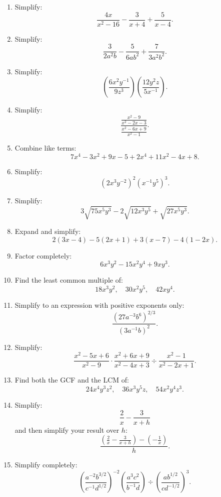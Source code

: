 \documentclass[12pt]{article}
\begin{document}
\begin{enumerate}
  \item Simplify:
  \[
  \frac{4x}{x^2-16}-\frac{3}{x+4}+\frac{5}{x-4}.
  \]

  \item Simplify:
  \[
  \frac{3}{2a^2b}-\frac{5}{6ab^2}+\frac{7}{3a^2b^2}.
  \]

  \item Simplify:
  \[
  \left(\frac{6x^2y^{-1}}{9z^3}\right)\left(\frac{12y^2z}{5x^{-1}}\right).
  \]

  \item Simplify:
  \[
  \frac{\frac{x^2-9}{x^2-2x-3}}{\frac{x^2-6x+9}{x^2-1}}.
  \]

  \item Combine like terms:
  \[
  7x^4-3x^2+9x-5+2x^4+11x^2-4x+8.
  \]

  \item Simplify:
  \[
  (2x^3y^{-2})^2(x^{-1}y^5)^3.
  \]

  \item Simplify:
  \[
  3\sqrt{75x^5y^3}-2\sqrt{12x^3y^5}+\sqrt{27x^5y^3}.
  \]

  \item Expand and simplify:
  \[
  2(3x-4)-5(2x+1)+3(x-7)-4(1-2x).
  \]

  \item Factor completely:
  \[
  6x^3y^2-15x^2y^4+9xy^3.
  \]

  \item Find the least common multiple of:
  \[
  18x^3y^2,\quad 30x^2y^5,\quad 42xy^4.
  \]

  \item Simplify to an expression with positive exponents only:
  \[
  \frac{(27a^{-3}b^6)^{2/3}}{(3a^{-1}b)^2}.
  \]

  \item Simplify:
  \[
  \frac{x^2-5x+6}{x^2-9}\cdot\frac{x^2+6x+9}{x^2-4x+3}\div\frac{x^2-1}{x^2-2x+1}.
  \]

  \item Find both the GCF and the LCM of:
  \[
  24x^4y^3z^2,\quad 36x^3y^5z,\quad 54x^2y^4z^3.
  \]

  \item Simplify:
  \[
  \frac{2}{x}-\frac{3}{x+h}
  \]
  and then simplify your result over $h$:
  \[
  \frac{\left(\frac{2}{x}-\frac{3}{x+h}\right)-\left(-\frac{1}{x}\right)}{h}.
  \]

  \item Simplify completely:
  \[
  \left(\frac{a^{-2}b^{3/2}}{c^{-1}d^{1/2}}\right)^{-2}
  \left(\frac{a^3c^2}{b^{-1}d}\right)
  \div
  \left(\frac{ab^{1/2}}{cd^{-1/2}}\right)^3.
  \]
\end{enumerate}
\end{document}
